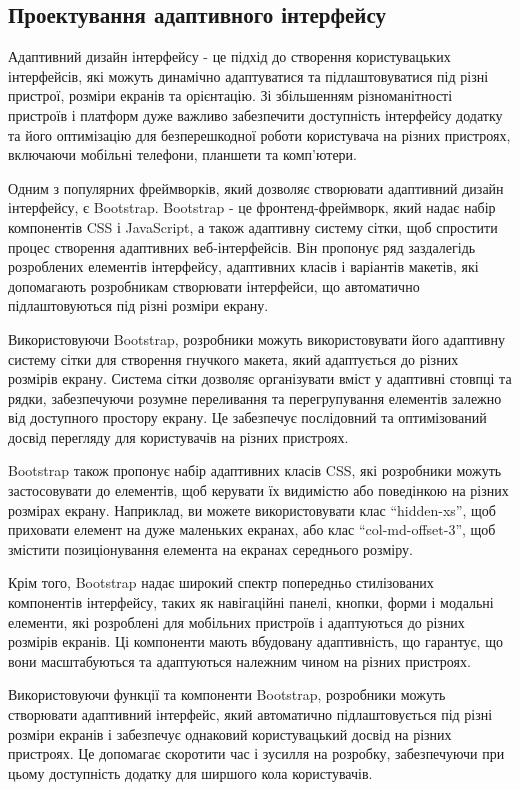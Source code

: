 \subsection{Проектування адаптивного інтерфейсу}
\label{subsec:adaptive-interface-subsection}

Адаптивний дизайн інтерфейсу - це підхід до створення користувацьких інтерфейсів, які можуть динамічно адаптуватися та підлаштовуватися під різні пристрої, розміри екранів та орієнтацію. Зі збільшенням різноманітності пристроїв і платформ дуже важливо забезпечити доступність інтерфейсу додатку та його оптимізацію для безперешкодної роботи користувача на різних пристроях, включаючи мобільні телефони, планшети та комп'ютери.

Одним з популярних фреймворків, який дозволяє створювати адаптивний дизайн інтерфейсу, є Bootstrap. Bootstrap - це фронтенд-фреймворк, який надає набір компонентів CSS і JavaScript, а також адаптивну систему сітки, щоб спростити процес створення адаптивних веб-інтерфейсів. Він пропонує ряд заздалегідь розроблених елементів інтерфейсу, адаптивних класів і варіантів макетів, які допомагають розробникам створювати інтерфейси, що автоматично підлаштовуються під різні розміри екрану.

Використовуючи Bootstrap, розробники можуть використовувати його адаптивну систему сітки для створення гнучкого макета, який адаптується до різних розмірів екрану. Система сітки дозволяє організувати вміст у адаптивні стовпці та рядки, забезпечуючи розумне переливання та перегрупування елементів залежно від доступного простору екрану. Це забезпечує послідовний та оптимізований досвід перегляду для користувачів на різних пристроях.

Bootstrap також пропонує набір адаптивних класів CSS, які розробники можуть застосовувати до елементів, щоб керувати їх видимістю або поведінкою на різних розмірах екрану. Наприклад, ви можете використовувати клас ``hidden-xs'', щоб приховати елемент на дуже маленьких екранах, або клас ``col-md-offset-3'', щоб змістити позиціонування елемента на екранах середнього розміру.

Крім того, Bootstrap надає широкий спектр попередньо стилізованих компонентів інтерфейсу, таких як навігаційні панелі, кнопки, форми і модальні елементи, які розроблені для мобільних пристроїв і адаптуються до різних розмірів екранів. Ці компоненти мають вбудовану адаптивність, що гарантує, що вони масштабуються та адаптуються належним чином на різних пристроях.

Використовуючи функції та компоненти Bootstrap, розробники можуть створювати адаптивний інтерфейс, який автоматично підлаштовується під різні розміри екранів і забезпечує однаковий користувацький досвід на різних пристроях. Це допомагає скоротити час і зусилля на розробку, забезпечуючи при цьому доступність додатку для ширшого кола користувачів.


